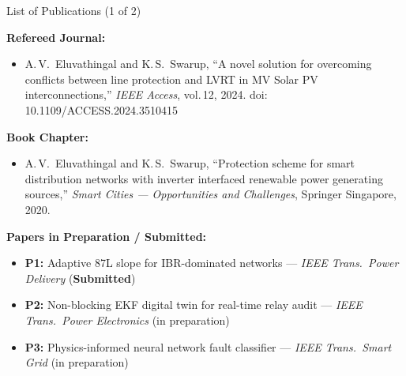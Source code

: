 \documentclass[aspectratio=169, 10pt]{beamer}
\begin{document}
\begin{frame}{List of Publications (1 of 2)}
  \vspace{0.2cm}

  {\small\bfseries\color{iitmMaroon} Refereed Journal:}
  \vspace{4pt}

  \begin{itemize}\scriptsize
    \setlength\itemsep{4pt}
    \item A.\,V.\ Eluvathingal and K.\,S.\ Swarup,
          ``A novel solution for overcoming conflicts between line
          protection and LVRT in MV Solar PV interconnections,''
          \textit{IEEE Access}, vol.\,12, 2024.
          doi: 10.1109/ACCESS.2024.3510415
  \end{itemize}

  \vspace{0.5cm}
  {\small\bfseries\color{iitmMaroon} Book Chapter:}
  \vspace{4pt}

  \begin{itemize}\scriptsize
    \setlength\itemsep{4pt}
    \item A.\,V.\ Eluvathingal and K.\,S.\ Swarup,
          ``Protection scheme for smart distribution networks with inverter
          interfaced renewable power generating sources,''
          \textit{Smart Cities --- Opportunities and Challenges}, Springer Singapore, 2020.
  \end{itemize}

  \vspace{0.5cm}
  {\small\bfseries\color{iitmMaroon} Papers in Preparation / Submitted:}
  \vspace{4pt}

  \begin{itemize}\scriptsize
    \setlength\itemsep{4pt}
    \item \textbf{P1:} Adaptive 87L slope for IBR-dominated networks
          --- \textit{IEEE Trans.\ Power Delivery} (\textcolor{thesisgreen}{\bfseries Submitted})
    \item \textbf{P2:} Non-blocking EKF digital twin for real-time relay audit
          --- \textit{IEEE Trans.\ Power Electronics} (in preparation)
    \item \textbf{P3:} Physics-informed neural network fault classifier
          --- \textit{IEEE Trans.\ Smart Grid} (in preparation)
  \end{itemize}


\end{frame}
\end{document}
